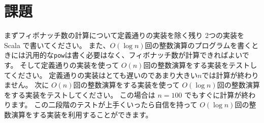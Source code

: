 \documentclass[a4paper,twoside,onecolumn,openany,article]{memoir}
\theoremstyle{plain}
\theoremstyle{remark}
\begin{document}
\section{課題}
まずフィボナッチ数の計算について定義通りの実装を除く残り 2つの実装を Scala で書いてください。
また、$O(\log n)$回の整数演算のプログラムを書くときには汎用的な\texttt{pow}は書く必要はなく、フィボナッチ数が計算できればよいです。
そして定義通りの実装を使って $O(n)$回の整数演算をする実装をテストしてください。
定義通りの実装はとても遅いのであまり大きい$n$では計算が終わりません。
次に $O(n)$回の整数演算をする実装を使って
$O(\log n)$回の整数演算をする実装をテストしてください。
この場合は $n=100$ でもすぐに計算が終わります。
この二段階のテストが上手くいったら自信を持って $O(\log n)$回の整数演算をする実装を利用することができます。
\end{document}
